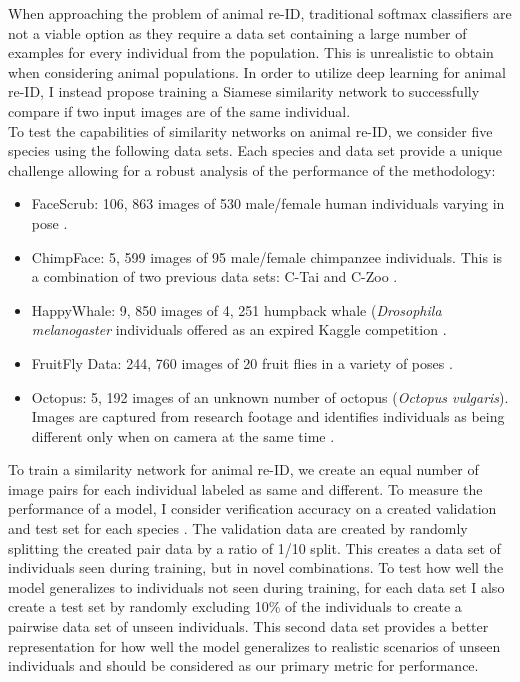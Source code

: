 \documentclass[11pt]{article}
\begin{document}
When approaching the problem of animal re-ID, traditional softmax classifiers are not a viable option as they require a  data set containing a large number of examples for every individual from the population. This is unrealistic to obtain when considering animal populations. In order to utilize deep learning for animal re-ID, I instead propose training a Siamese similarity network to successfully compare if two input images are of the same individual.
\newline
\\
To test the capabilities of similarity networks on animal re-ID, we consider five species using the following data sets. Each species and data set provide a unique challenge allowing for a robust analysis of the performance of the methodology:

\begin{itemize}
	\item FaceScrub: 106, 863 images of 530 male/female human individuals varying in pose \cite{ng2014data}.
	\item ChimpFace: 5, 599 images of 95 male/female chimpanzee individuals. This is a combination of two previous data sets: C-Tai and C-Zoo \cite{freytag2016chimpanzee}.
	\item HappyWhale: 9, 850 images of 4, 251 humpback whale (\textit{Drosophila melanogaster} individuals offered as an expired Kaggle competition \cite{kagglehumpbackreid}.
	\item FruitFly Data: 244, 760 images of 20 fruit flies in a variety of poses \cite{schneider2018can}.
	\item Octopus: 5, 192 images of an unknown number of octopus (\textit{Octopus vulgaris}). Images are captured from research footage and identifies individuals as being different only when on camera at the same time \cite{scheel2017second}. 
\end{itemize}	

\noindent
To train a similarity network for animal re-ID, we create an equal number of image pairs for each individual labeled as same and different. To measure the performance of a model, I consider verification accuracy on a created validation and test set for each species \cite{deb2018face}. The validation data are created by randomly splitting the created pair data by a ratio of 1/10 split. This creates a data set of individuals seen during training, but in novel combinations. To test how well the model generalizes to individuals not seen during training, for each data set I also create a test set by randomly excluding 10\% of the individuals to create a pairwise data set of unseen individuals. This second data set provides a better representation for how well the model generalizes to realistic scenarios of unseen individuals and should be considered as our primary metric for performance. 
\newline
\end{document}
